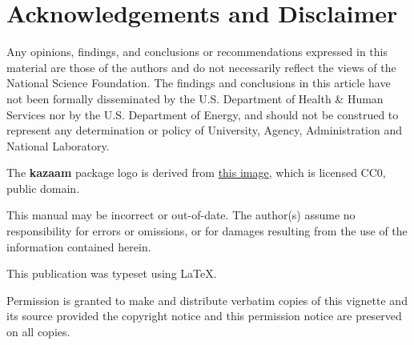 \section*{Acknowledgements and Disclaimer}
Any opinions, findings, and conclusions or recommendations expressed in  this 
material are those of the authors and do not necessarily reflect the  views of 
the National Science Foundation.  The findings and conclusions in this article 
have not been formally disseminated by the U.S. Department of Health \& Human 
Services nor by the U.S. Department of Energy, and should not be construed to 
represent any determination or policy of University, Agency, Administration and 
National Laboratory.

The \textbf{kazaam} package logo is derived from
\href{https://pixabay.com/en/ghettoblaster-boombox-old-school-1225920/}{this image},
which is licensed CC0, public domain.

This manual may be incorrect or out-of-date.  The author(s) assume
no responsibility for errors or omissions, or for damages resulting
from the use of the information contained herein.

This publication was typeset using \LaTeX.

\vfill

\null
\vfill
Permission is granted to make and distribute verbatim copies of
this vignette and its source provided the copyright notice and
this permission notice are preserved on all copies.
